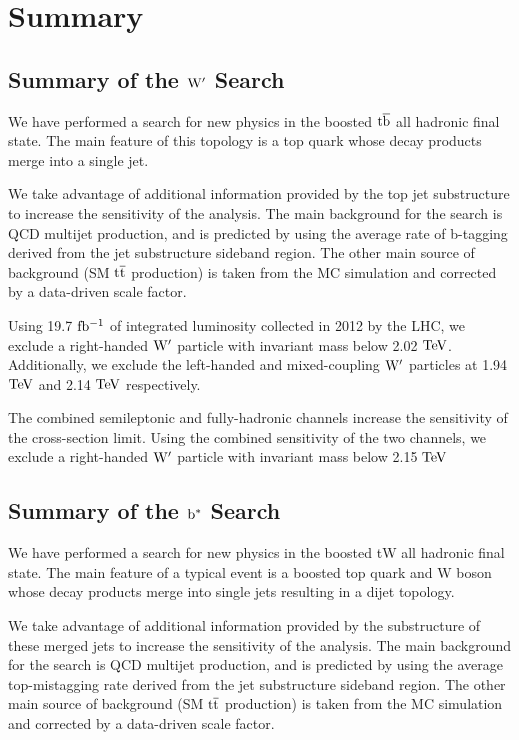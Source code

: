 \clearpage
\newpage
\chapter{Summary}

\section{Summary of the $\mathrm{W}^{\prime}$ Search}
We have performed a search for new physics in the boosted $\mathrm{t\overline{b}}$ all
hadronic final state.  The main feature of this topology is a top quark
whose decay products merge into a single jet. 

We take advantage of additional information provided by the top jet
substructure to increase the sensitivity of the analysis.  The main background for
the search is QCD multijet production, and is predicted by using the
average rate of b-tagging derived from the jet substructure sideband
region.  The other main source of background (SM $\mathrm{t\overline{t}}$ production) is taken from 
the MC simulation and corrected by a data-driven scale factor.

Using 19.7$~\mathrm{fb^{-1}}$ of integrated luminosity collected in 2012 by the
LHC, we exclude a right-handed $\mathrm{W}^{\prime}$ particle with invariant mass
below 2.02 $\mathrm{TeV}$.  Additionally, we exclude the left-handed and mixed-coupling $\mathrm{W}^{\prime}$ particles at 1.94 $\mathrm{TeV}$ and 2.14 $\mathrm{TeV}$ respectively.

The combined semileptonic and fully-hadronic channels increase the sensitivity of the cross-section limit.  
Using the combined sensitivity of the two channels, we exclude a right-handed $\mathrm{W}^{\prime}$ particle with invariant mass below 2.15$~\mathrm{TeV}$  



\section{Summary of the $\mathrm{b}^{*}$ Search}
We have performed a search for new physics in the boosted tW all
hadronic final state.  The main feature of a typical event is a boosted top quark and W boson
whose decay products merge into single jets resulting in a dijet topology. 

We take advantage of additional information provided by the 
substructure of these merged jets  to increase the sensitivity of the analysis.  The main background for
the search is QCD multijet production, and is predicted by using the
average top-mistagging rate derived from the jet substructure sideband
region.  The other main source of background (SM $\mathrm{t\overline{t}}$ production) is taken from 
the MC simulation and corrected by a data-driven scale factor.

